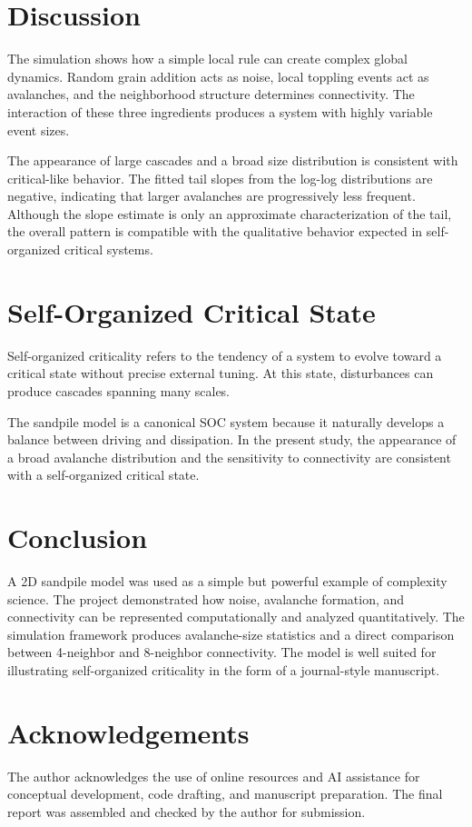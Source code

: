 \documentclass[12pt]{article}
\begin{document}
\section{Discussion}
The simulation shows how a simple local rule can create complex global dynamics. Random grain addition acts as noise, local toppling events act as avalanches, and the neighborhood structure determines connectivity. The interaction of these three ingredients produces a system with highly variable event sizes.

The appearance of large cascades and a broad size distribution is consistent with critical-like behavior. The fitted tail slopes from the log-log distributions are negative, indicating that larger avalanches are progressively less frequent. Although the slope estimate is only an approximate characterization of the tail, the overall pattern is compatible with the qualitative behavior expected in self-organized critical systems.

\section{Self-Organized Critical State}
Self-organized criticality refers to the tendency of a system to evolve toward a critical state without precise external tuning. At this state, disturbances can produce cascades spanning many scales.

The sandpile model is a canonical SOC system because it naturally develops a balance between driving and dissipation. In the present study, the appearance of a broad avalanche distribution and the sensitivity to connectivity are consistent with a self-organized critical state.

\section{Conclusion}
A 2D sandpile model was used as a simple but powerful example of complexity science. The project demonstrated how noise, avalanche formation, and connectivity can be represented computationally and analyzed quantitatively. The simulation framework produces avalanche-size statistics and a direct comparison between 4-neighbor and 8-neighbor connectivity. The model is well suited for illustrating self-organized criticality in the form of a journal-style manuscript.

\section{Acknowledgements}
The author acknowledges the use of online resources and AI assistance for conceptual development, code drafting, and manuscript preparation. The final report was assembled and checked by the author for submission.
\end{document}
